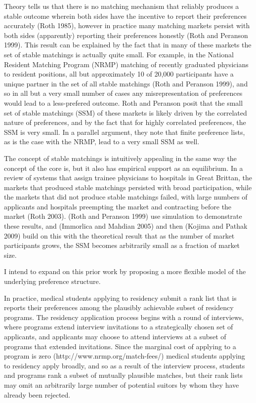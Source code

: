 \documentclass[WP]{AEA}
\begin{document}
Theory tells us that there is no matching mechanism that reliably produces a stable outcome wherein both sides have the incentive to report their preferences accurately (Roth 1985), however in practice many matching markets persist with both sides (apparently) reporting their preferences honestly  (Roth and Peranson 1999).  This result can be explained by the fact that in many of these markets the set of stable matchings is actually quite small.  For example, in the National Resident Matching Program (NRMP) matching of recently graduated physicians to resident positions, all but approximately 10 of 20,000 participants have a unique partner in the set of all stable matchings (Roth and Peranson 1999), and so in all but a very small number of cases any misrepresentation of preferences would lead to a less-prefered outcome. Roth and Peranson posit that the small set of stable matchings (SSM) of these markets is likely driven by the correlated nature of preferences, and by the fact that for highly correlated preferences, the SSM is very small.  In a parallel argument,  they note that finite preference lists, as is the case with the NRMP, lead to a very small SSM as well.  

The concept of stable matchings is intuitively appealing in the same way the concept of the core is, but it also has empirical support as an equilibrium. In a review of systems that assign trainee physicians to hospitals in Great Brittan, the markets that produced stable matchings persisted with broad participation, while the markets that did not produce stable matchings failed, with large numbers of applicants and hospitals preempting the market and contracting before the market (Roth 2003).
(Roth and Peranson 1999) use simulation to demonstrate these results, and (Immorlica and Mahdian 2005) and then (Kojima and Pathak 2009) build on this with the theoretical result that as the number of market participants grows, the SSM becomes arbitrarily small as a fraction of market size.  

I intend to expand on this prior work by proposing a more flexible model of the underlying preference structure.

In practice, medical students applying to residency submit a rank list that is reports their preferences among the plausibly achievable subset of residency programs. The residency application process begins with a round of interviews, where programs extend interview invitations to a strategically chosen set of applicants, and applicants may choose to attend interviews at a subset of programs that extended invitations. Since the marginal cost of applying to a program is zero (http://www.nrmp.org/match-fees/) medical students applying to residency apply broadly, and so as a result of the interview process, students and programs rank a subset of mutually plausible matches, but their rank lists may omit an arbitrarily large number of potential suitors by whom they have already been rejected.
\end{document}
